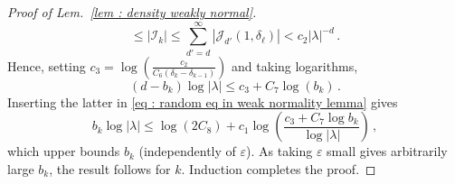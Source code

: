 \documentclass[a4paper,UKenglish,cleveref, autoref, thm-restate]{lipics-v2021}
\begin{document}
\begin{proof}[Proof of Lem.~\ref{lem : density weakly normal}]
\begin{equation*}
         \le |\mathcal{I}_k| \le \sum_{d' = d}^\infty
         |\mathcal{J}_{d'}(1,\delta_\ell)| < c_2|\lambda|^{-d} \, .
    \end{equation*}
    Hence, setting $c_3 = \log(\frac{c_2}{C_6(\delta_k-\delta_{k-1})})$ and taking logarithms,
    \begin{equation}\label{eq : second to last induction}
         (d - b_k)\log|\lambda| \le c_3 + C_7\log(b_k) \, .
    \end{equation}
    Inserting the latter in \eqref{eq : random eq in weak normality lemma} gives
    \begin{equation*}
         b_k\log|\lambda| \le \log(2C_8) + c_1\log\left(\frac{c_3 +
             C_7\log b_k}{\log|\lambda|}\right) \, ,
    \end{equation*}
    which upper bounds $b_k$ (independently of $\varepsilon$).
    As taking $\varepsilon$ small gives arbitrarily large $b_k$, the result follows for $k$. 
    Induction completes the proof.
\end{proof}
\end{document}
